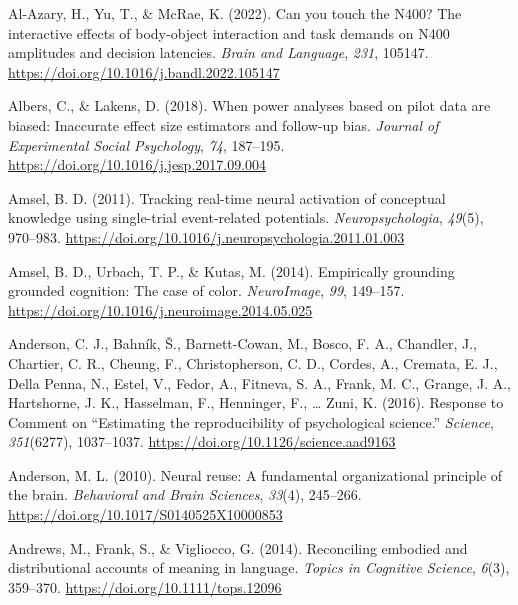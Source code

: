 \documentclass[
  12pt,
  man,floatsintext]{apa7}
\newlength{\cslhangindent}
\newlength{\cslentryspacingunit} %
\newenvironment{CSLReferences}[2] %
 {%
  \setlength{\parindent}{0pt}
  \ifodd #1
  \let\oldpar\par
  \def\par{\hangindent=\cslhangindent\oldpar}
  \fi
  \setlength{\parskip}{#2\cslentryspacingunit}
 }%
 {}
\begin{document}
\hypertarget{refs}{}
\begin{CSLReferences}{1}{0}
\leavevmode{}%
Al-Azary, H., Yu, T., \& McRae, K. (2022). Can you touch the {N400}? {The} interactive effects of body-object interaction and task demands on {N400} amplitudes and decision latencies. \emph{Brain and Language}, \emph{231}, 105147. \url{https://doi.org/10.1016/j.bandl.2022.105147}

\leavevmode{}%
Albers, C., \& Lakens, D. (2018). When power analyses based on pilot data are biased: {Inaccurate} effect size estimators and follow-up bias. \emph{Journal of Experimental Social Psychology}, \emph{74}, 187--195. \url{https://doi.org/10.1016/j.jesp.2017.09.004}

\leavevmode{}%
Amsel, B. D. (2011). Tracking real-time neural activation of conceptual knowledge using single-trial event-related potentials. \emph{Neuropsychologia}, \emph{49}(5), 970--983. \url{https://doi.org/10.1016/j.neuropsychologia.2011.01.003}

\leavevmode{}%
Amsel, B. D., Urbach, T. P., \& Kutas, M. (2014). Empirically grounding grounded cognition: {The} case of color. \emph{NeuroImage}, \emph{99}, 149--157. \url{https://doi.org/10.1016/j.neuroimage.2014.05.025}

\leavevmode{}%
Anderson, C. J., Bahník, Š., Barnett-Cowan, M., Bosco, F. A., Chandler, J., Chartier, C. R., Cheung, F., Christopherson, C. D., Cordes, A., Cremata, E. J., Della Penna, N., Estel, V., Fedor, A., Fitneva, S. A., Frank, M. C., Grange, J. A., Hartshorne, J. K., Hasselman, F., Henninger, F., \ldots{} Zuni, K. (2016). Response to {Comment} on {``{Estimating} the reproducibility of psychological science.''} \emph{Science}, \emph{351}(6277), 1037--1037. \url{https://doi.org/10.1126/science.aad9163}

\leavevmode{}%
Anderson, M. L. (2010). Neural reuse: {A} fundamental organizational principle of the brain. \emph{Behavioral and Brain Sciences}, \emph{33}(4), 245--266. \url{https://doi.org/10.1017/S0140525X10000853}

\leavevmode{}%
Andrews, M., Frank, S., \& Vigliocco, G. (2014). Reconciling embodied and distributional accounts of meaning in language. \emph{Topics in Cognitive Science}, \emph{6}(3), 359--370. \url{https://doi.org/10.1111/tops.12096}


\end{CSLReferences}
\end{document}
